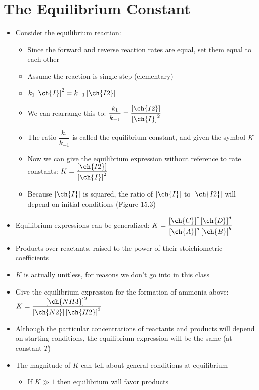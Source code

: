 \documentclass[12pt, openany, letterpaper]{memoir}
\begin{document}
\section{The Equilibrium Constant}
\begin{itemize}
	\item Consider the equilibrium reaction: 
	\begin{itemize}
		\item Since the forward and reverse reaction rates are equal, set them equal to each other
		\item Assume the reaction is single-step (elementary)
		\item $k_1\left[\ch{I}\right]^2=k_{-1}\left[\ch{I2}\right]$
		\item We can rearrange this to: $\dfrac{k_1}{k_{-1}}=\dfrac{\left[\ch{I2}\right]}{\left[\ch{I}\right]^2}$
		\item The ratio $\dfrac{k_1}{k_{-1}}$ is called the equilibrium constant, and given the symbol $K$
		\item Now we can give the equilibrium expression without reference to rate constants: $K = \dfrac{\left[\ch{I2}\right]}{\left[\ch{I}\right]^2}$
		\item Because $\left[\ch{I}\right]$ is squared, the ratio of $\left[\ch{I}\right]$ to $\left[\ch{I2}\right]$ will depend on initial conditions (Figure 15.3)		
	\end{itemize}
	\item Equilibrium expressions can be generalized: \hspace{1em}$K=\dfrac{\left[\ch{C}\right]^c\left[\ch{D}\right]^d}{\left[\ch{A}\right]^a\left[\ch{B}\right]^b}$ 
	\item Products over reactants, raised to the power of their stoichiometric coefficients
	\item $K$ is actually unitless, for reasons we don't go into in this class
	\item Give the equilibrium expression for the formation of ammonia above: $K=\dfrac{\left[\ch{NH3}\right]^2}{\left[\ch{N2}\right]\left[\ch{H2}\right]^3}$
	\item Although the particular concentrations of reactants and products will depend on starting conditions, the equilibrium expression will be the same (at constant $T$)
	\item The magnitude of $K$ can tell about general conditions at equilibrium
	\begin{itemize}
		\item If $K \gg 1$ then equilibrium will favor products

\end{itemize}
\end{itemize}
\end{document}
